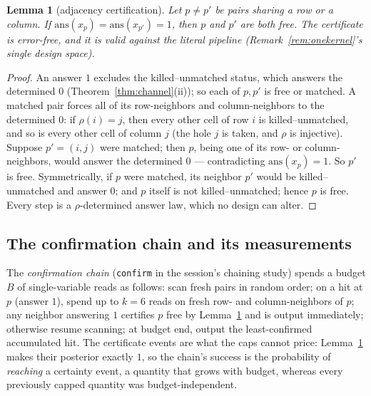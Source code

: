 \documentclass[11pt]{article}
\newtheorem{lemma}[theorem]{Lemma}
\theoremstyle{definition}
\theoremstyle{remark}
\begin{document}
\begin{lemma}[adjacency certification]\label{lem:adjacency}
Let $p\neq p'$ be pairs sharing a row or a column.  If
$\mathrm{ans}(x_p)=\mathrm{ans}(x_{p'})=1$, then $p$ and $p'$ are both
free.  The certificate is error-free, and it is valid against the
literal pipeline (Remark~\ref{rem:onekernel}'s single design space).
\end{lemma}

\begin{proof}
An answer $1$ excludes the killed--unmatched status, which answers the
determined $0$ (Theorem~\ref{thm:channel}(ii)); so each of $p,p'$ is
free or matched.  A matched pair forces all of its row-neighbors and
column-neighbors to the determined $0$: if $\rho(i)=j$, then every
other cell of row $i$ is killed--unmatched, and so is every other cell
of column $j$ (the hole $j$ is taken, and $\rho$ is injective).
Suppose $p'=(i,j)$ were matched; then $p$, being one of its
row- or column-neighbors, would answer the determined $0$ ---
contradicting $\mathrm{ans}(x_p)=1$.  So $p'$ is free.  Symmetrically,
if $p$ were matched, its neighbor $p'$ would be killed--unmatched and
answer $0$; and $p$ itself is not killed--unmatched; hence $p$ is
free.  Every step is a $\rho$-determined answer law, which no design
can alter.
\end{proof}

\subsection{The confirmation chain and its measurements}

The \emph{confirmation chain} (\texttt{confirm} in the session's
chaining study) spends a budget $B$ of single-variable reads as
follows: scan fresh pairs in random order; on a hit at $p$ (answer
$1$), spend up to $k=6$ reads on fresh row- and column-neighbors of
$p$; any neighbor answering $1$ certifies $p$ free by
Lemma~\ref{lem:adjacency} and is output immediately; otherwise resume
scanning; at budget end, output the least-confirmed accumulated hit.
The certificate events are what the caps cannot price:
Lemma~\ref{lem:adjacency} makes their posterior exactly $1$, so the
chain's success is the probability of \emph{reaching} a certainty
event, a quantity that grows with budget, whereas every previously
capped quantity was budget-independent.
\end{document}
